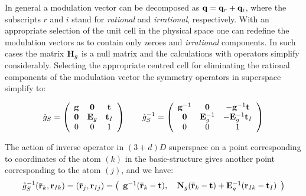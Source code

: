 \documentclass[10pt]{article}
\begin{document}
In general a modulation vector can be decomposed as ${\bf q}={\bf q}_r+{\bf q}_i$, where the subscripts $r$ and $i$ stand for {\it rational} and {\it irrational}, respectively. With an appropriate selection of the unit cell in the physical space one can redefine the modulation vectors as to contain only zeroes and {\it irrational} components. In such cases the matrix ${\bf H}_g$ is a null matrix and the calculations with operators simplify considerably. Selecting the appropriate centred cell for eliminating the rational components of the modulation vector the symmetry operators in superspace simplify to:

\begin{equation} \label{simplified_op}
\begin{array} {l}
{\hat g}_S = \left( {\begin{array}{*{20}{c}}
	{\bf g}    &{\bf 0}    &{\bf t}\\
	{{\bf 0}}  &{{\bf E}_g}&{\bf t}_I\\
	{0}     &{0}        &{1}
	\end{array}} \right) \qquad {\hat g}_S^{-1} =\left( {\begin{array}{*{20}{c}}
	{\bf g}^{-1}                &{\bf 0}        &	-{\bf g}^{-1}{\bf t}\\
	{\bf 0}  &{\bf E}_g^{-1}  & - {\bf E}_g^{-1}{\bf t}_I\\
	{0}                        &{0}            &{1}
	\end{array}} \right)
\end{array}
\end{equation}


The action of inverse operator in $(3+d)D$ superspace on a point corresponding to coordinates of the atom $(k)$ in the basic-structure gives another point corresponding to the atom $(j)$, and we have:
\begin{equation} \label{action_inverse_op}
\begin{array} {l}
{\hat g}_S^{-1} (\bar {\bf r}_k,{\bf r}_{Ik}) = (\bar {\bf r}_j,{\bf r}_{Ij}) = \left( {\begin{array}{*{20}{c}}
	{\bf g}^{-1}  (\bar {\bf r}_k - {\bf t}), \quad
	{\bf N}_g( \bar {\bf r}_k-{\bf t}) +{\bf E}_g^{-1} ({\bf r}_{Ik} -{\bf t}_I)   
	\end{array}} \right)
\end{array}
\end{equation}
\end{document}
